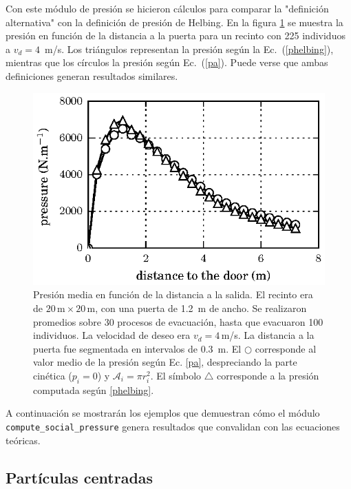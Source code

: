 Con este módulo de presión se hicieron cálculos para comparar la "definición alternativa" con la definición de presión de Helbing. En la figura \ref{comparacion} se muestra la presión en función de la distancia a la puerta para un recinto con 225 individuos a $v_d=4$~m/s. Los triángulos representan la presión según la Ec.~(\ref{phelbing}), mientras que los círculos la presión según Ec.~(\ref{pa}). Puede verse que ambas definiciones generan resultados similares. 

\begin{figure}[H]
    \centering
    \includegraphics[scale=1]{figuras/fig16.eps}
    \caption[width=5cm]{Presión media en función de la distancia a la salida. El recinto era de $20\,\mathrm{m}\times20\,\mathrm{m}$, con una puerta de 1.2~m de ancho. Se realizaron promedios sobre 30 procesos de evacuación, hasta que evacuaron 100 individuos. La velocidad de deseo era $v_d=4\,$m/s. La distancia a la puerta fue segmentada en intervalos de $0.3$~m.  El $\bigcirc$  corresponde al valor medio de la presión según Ec. \ref{pa}, despreciando la parte cinética ($p_i=0$) y $\mathcal{A}_i=\pi r_i^2$. El símbolo $\bigtriangleup$ corresponde a la presión computada según \ref{phelbing}. }
    \label{comparacion}
\end{figure}

A continuación se mostrarán los ejemplos que demuestran cómo el módulo    {\tt compute\_social\_pressure} genera resultados que convalidan con las ecuaciones teóricas.  

\subsection{Partículas centradas}

